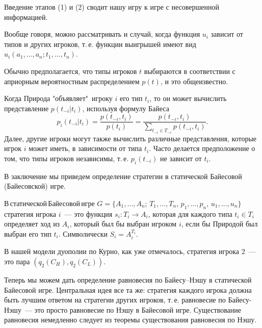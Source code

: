 Введение этапов (1) и (2) сводит нашу игру к игре с несовершенной
информацией.

Вообще говоря, можно рассматривать и случай, когда функция $u_i$
зависит  от типов и других игроков, т.\,е. функции выигрышей имеют
вид $u_i(a_1,\ldots,a_n;t_1,\ldots,t_n)$.

Обычно предполагается, что типы игроков $t$ выбираются в соответствии с априорным
вероятностным распределением $p(t)$,  и это общеизвестно.

Когда Природа "объявляет"\, игроку $i$ его тип $t_i$, то он может
вычислить представление $p(t_{-i}|t_i)$, используя формулу Байеса
$$
p_i(t_{-i}|t_i)={\frac{p(t_{-i},t_i)}{p(t_i)}}={\frac{p(t_{-
i},t_i)}{\sum_{t_{-i}\in T_{-i}}p(t_{-i},t_i)}}.
$$
Далее, другие игроки могут также вычислить различные представления,
которые игрок $i$ может иметь, в зависимости от типа $t_i$. Часто
делается предположение о том, что типы игроков независимы, т.\,е. $p_i(t_{-i})$ не
зависит от $t_i$.

В заключение мы приведем определение стратегии в статической Байесовой
(Байесовской) игре.

\begin{definition}
В\,статической\,Байесовой\,игре
$G=\{A_1,\ldots,A_n$; $T_1,\ldots,T_n$, $p_1,\ldots,p_n$, $u_1,\ldots,u_n\}$
стратегия игрока $i$~---  это функция $s_i:T_i\to A_i$, которая для
каждого типа $t_i\in T_i$ определяет ход из $A_i$, который был бы выбран
игроком $i$, если бы Природой был выбран его тип $t_i$. Символически
$S_i=A_i^{T_i}.$
\end{definition}


В нашей модели дуополии по Курно, как уже отмечалось, стратегия
игрока 2~--- это пара $(q_2(C_H),q_2(C_L))$.

Теперь мы можем дать определение равновесия по Байесу--Нэшу в
статической Байесовой игре. Центральная идея все та же: стратегия
каждого игрока должна быть лучшим ответом на стратегии других
игроков, т.\,е. равновесие по Байесу-Нэшу~--- это просто
равновесие по Нэшу в Байесовой игре. Существование равновесия
немедленно следует из теоремы существования равновесия по Нэшу.
